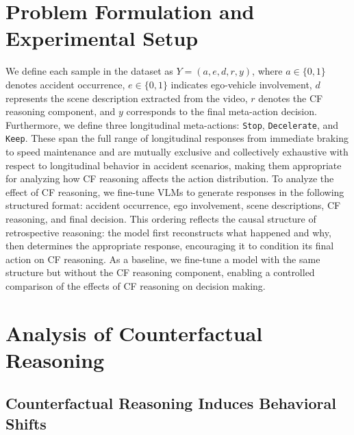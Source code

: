 \documentclass{article}
\begin{document}
\section{Problem Formulation and Experimental Setup}
We define each sample in the dataset as $Y = (a, e, d, r, y)$, where $a \in \{0,1\}$ denotes accident occurrence, $e \in \{0,1\}$ indicates ego-vehicle involvement, $d$ represents the scene description extracted from the video, $r$ denotes the CF reasoning component, and $y$ corresponds to the final meta-action decision. 
Furthermore, we define three longitudinal meta-actions: \texttt{Stop}, \texttt{Decelerate}, and \texttt{Keep}. These span the full range of longitudinal responses from immediate braking to speed maintenance and are mutually exclusive and collectively exhaustive with respect to longitudinal behavior in accident scenarios, making them appropriate for analyzing how CF reasoning affects the action distribution. To analyze the effect of CF reasoning, we fine-tune VLMs to generate responses in the following structured format: accident occurrence, ego involvement, scene descriptions, CF reasoning, and final decision. This ordering reflects the causal structure of retrospective reasoning: the model first reconstructs what happened and why, then determines the appropriate response, encouraging it to condition its final action on CF reasoning. As a baseline, we fine-tune a model with the same structure but without the CF reasoning component, enabling a controlled comparison of the effects of CF reasoning on decision making. 



\section{Analysis of Counterfactual Reasoning}
\label{sec:analysis}

\subsection{Counterfactual Reasoning Induces Behavioral Shifts}
\label{subsec:sft_analysis}

\end{document}
